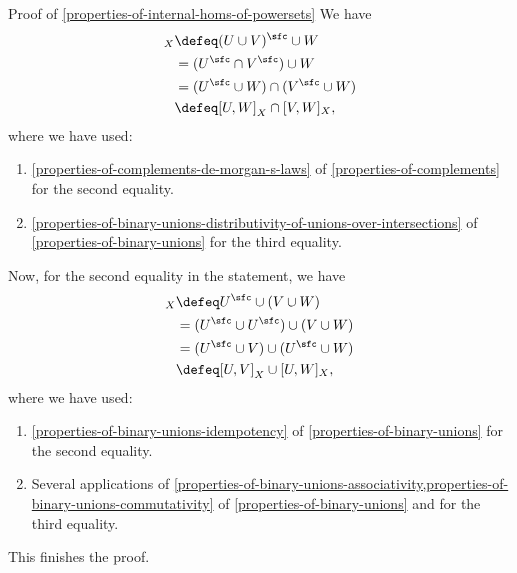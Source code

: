 \begin{Proof}{Proof of \cref{properties-of-internal-homs-of-powersets}}
    We have
    \begin{align*}
        [U\cup V,W]_{X} &\defeq (U\cup V)^{\sfc}\cup W\\
                        &=      (U^{\sfc}\cap V^{\sfc})\cup W\\
                        &=      (U^{\sfc}\cup W)\cap(V^{\sfc}\cup W)\\
                        &\defeq [U,W]_{X}\cap[V,W]_{X},
    \end{align*}
    where we have used:
    \begin{enumerate}
        \item\label{proof-of-properties-of-internal-homs-of-powersets-interaction-with-binary-intersections-1}\cref{properties-of-complements-de-morgan-s-laws} of \cref{properties-of-complements} for the second equality.
        \item\label{proof-of-properties-of-internal-homs-of-powersets-interaction-with-binary-intersections-2}\cref{properties-of-binary-unions-distributivity-of-unions-over-intersections} of \cref{properties-of-binary-unions} for the third equality.
    \end{enumerate}
    Now, for the second equality in the statement, we have
    \begin{align*}
        [U,V\cup W]_{X} &\defeq U^{\sfc}\cup(V\cup W)\\
                        &=      (U^{\sfc}\cup U^{\sfc})\cup(V\cup W)\\
                        &=      (U^{\sfc}\cup V)\cup(U^{\sfc}\cup W)\\
                        &\defeq [U,V]_{X}\cup[U,W]_{X},
    \end{align*}
    where we have used:
    \begin{enumerate}
        \item\label{proof-of-properties-of-internal-homs-of-powersets-interaction-with-binary-intersections-3}\cref{properties-of-binary-unions-idempotency} of \cref{properties-of-binary-unions} for the second equality.
        \item\label{proof-of-properties-of-internal-homs-of-powersets-interaction-with-binary-intersections-4}Several applications of \cref{properties-of-binary-unions-associativity,properties-of-binary-unions-commutativity} of \cref{properties-of-binary-unions} and for the third equality.
    \end{enumerate}
    This finishes the proof.


\end{Proof}
